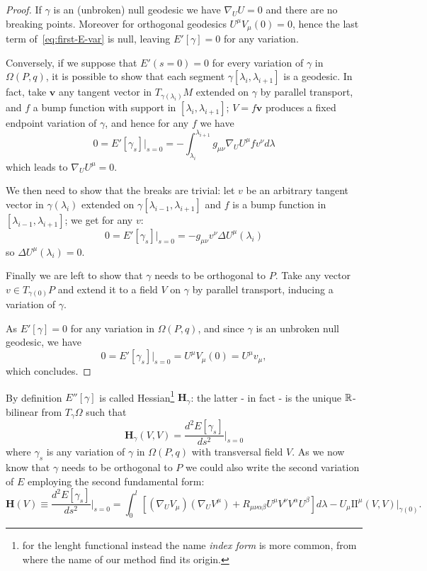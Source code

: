 \begin{proof}
	If \(\gamma\) is an (unbroken) null geodesic we have \(\nabla_UU = 0\) and there are no breaking points. Moreover for orthogonal geodesics
	\(U^{\mu}V_{\mu}(0) = 0\), hence the last term of~\eqref{eq:first-E-var} is null, leaving \(E'[\gamma] = 0\) for any variation.
	
	Conversely, if we suppose that \(E'(s =0) = 0\) for every variation of \(\gamma\) in \(\Omega (P,q)\), it is possible to show that each segment \(\gamma[\lambda_i, \lambda_{i + 1}]\) is a geodesic.
	In fact, take \(\textbf{v}\) any tangent vector in \(T_{\gamma(\lambda_i)}M\)  extended on \(\gamma\) by parallel transport, and \(f\) a bump function with support in \([\lambda_i, \lambda_{i + 1}]\); \(V = f\textbf{v}\) produces a fixed endpoint variation of \(\gamma\), and hence for any \(f\) we have 
	\[
	0 = E'[\gamma_s]\vert_{s = 0} = -\int_{\lambda_i}^{\lambda_{i+1}} g_{\mu\nu}\nabla_UU^{\mu} f v^{\nu} d\lambda
	\]
	which leads to \(\nabla_UU^{\mu} = 0\).
	
	We then need to show that the breaks are trivial: let \(v\) be an arbitrary tangent vector in \(\gamma(\lambda_i)\) extended on \(\gamma[\lambda_{i - 1}, \lambda_{i + 1}]\) and \(f\) is a bump function in \([\lambda_{i - 1}, \lambda_{i + 1}]\); we get for any \(v\):
	\[
	0 = E'[\gamma_s]\vert_{s = 0} = -g_{\mu\nu}v^{\nu}\Delta U^{\mu}(\lambda_i)
	\]
	so \(\Delta U^{\mu}(\lambda_i) = 0\).
	
	Finally we are left to show that \(\gamma\) needs to be orthogonal to \(P\). Take any vector \(v \in T_{\gamma(0)}P\) and extend it to a field \(V\) on \(\gamma\) by parallel transport, inducing a variation of \(\gamma\).
	
	\noindent As \(E'[\gamma] = 0\) for any variation in \(\Omega(P, q)\), and since \(\gamma\) is an unbroken null geodesic, we have
	\[
	0 = E'[\gamma_s] \Big\vert_{s = 0} = U^{\mu}V_{\mu} (0) = U^{\mu}v_{\mu},
	\]
	which concludes.
\end{proof}

By definition \(E''[\gamma]\) is called Hessian\footnote{for the lenght functional instead the name \emph{index form} is more common, from where the name of our method find its origin.} \(\textbf{H}_{\gamma}\): the latter - in fact - is the unique \({\mathbb{R}}\)-bilinear from \(T_{\gamma}\Omega\) such that 
\[
\textbf{H}_{\gamma}(V, V) = \frac{d^2E[\gamma_s]}{ds^2}\Big\vert_{s = 0}
\]
where \(\gamma_s\) is any variation of \(\gamma\) in \(\Omega(P, q)\) with transversal field \(V\).
As we now know that \(\gamma\) needs to be orthogonal to \(P\) we could also write the second variation of \(E\) employing the second fundamental form:
{\small
	\begin{equation}
	\label{eq:hessian}
	\textbf{H}(V) \equiv\frac{d^2E[\gamma_s]}{ds^2}\Big\vert_{s = 0} = 
	\int_{0}^{l} \left[(\nabla_UV_{\mu})(\nabla_UV^{\mu}) + R_{\mu\nu\alpha\beta}U^{\mu}V^{\nu}V^{\alpha}U^{\beta}\right] d\lambda - U_{\mu}\mathrm{I\!I}^{\mu}(V, V)\Big\vert_{\gamma(0)}.
\end{equation}}

